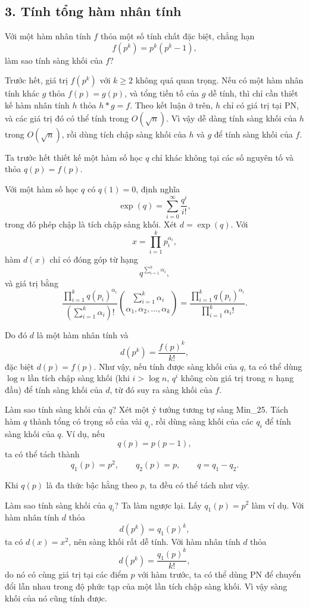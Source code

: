 \documentclass[11pt]{article}
\begin{document}
\subsection*{3. Tính tổng hàm nhân tính}

Với một hàm nhân tính \(f\) thỏa một số tính chất đặc biệt, chẳng hạn
\[
  f(p^k)=p^k(p^k-1),
\]
làm sao tính sàng khối của \(f\)?

Trước hết, giá trị \(f(p^k)\) với \(k\ge 2\) không quá quan trọng. Nếu có một
hàm nhân tính khác \(g\) thỏa \(f(p)=g(p)\), và tổng tiền tố của \(g\) dễ tính,
thì chỉ cần thiết kế hàm nhân tính \(h\) thỏa \(h*g=f\). Theo kết luận ở trên,
\(h\) chỉ có giá trị tại PN, và các giá trị đó có thể tính trong \(O(\sqrt n)\).
Vì vậy dễ dàng tính sàng khối của \(h\) trong \(O(\sqrt n)\), rồi dùng tích
chập sàng khối của \(h\) và \(g\) để tính sàng khối của \(f\).

Ta trước hết thiết kế một hàm số học \(q\) chỉ khác không tại các số nguyên tố
và thỏa \(q(p)=f(p)\).

Với một hàm số học \(q\) có \(q(1)=0\), định nghĩa
\[
  \exp(q)=\sum_{i=0}^{\infty}\frac{q^i}{i!},
\]
trong đó phép chập là tích chập sàng khối. Xét \(d=\exp(q)\). Với
\[
  x=\prod_{i=1}^{k} p_i^{\alpha_i},
\]
hàm \(d(x)\) chỉ có đóng góp từ hạng
\[
  q^{\sum_{i=1}^{k}\alpha_i},
\]
và giá trị bằng
\[
  \frac{\prod_{i=1}^{k} q(p_i)^{\alpha_i}}
       {\left(\sum_{i=1}^{k}\alpha_i\right)!}
  \binom{\sum_{i=1}^{k}\alpha_i}{\alpha_1,\alpha_2,\ldots,\alpha_k}
  =
  \frac{\prod_{i=1}^{k} q(p_i)^{\alpha_i}}
       {\prod_{i=1}^{k}\alpha_i!}.
\]

Do đó \(d\) là một hàm nhân tính và
\[
  d(p^k)=\frac{f(p)^k}{k!},
\]
đặc biệt \(d(p)=f(p)\). Như vậy, nếu tính được sàng khối của \(q\), ta có thể
dùng \(\log n\) lần tích chập sàng khối (khi \(i>\log n\), \(q^i\) không còn
giá trị trong \(n\) hạng đầu) để tính sàng khối của \(d\), từ đó suy ra sàng
khối của \(f\).

Làm sao tính sàng khối của \(q\)? Xét một ý tưởng tương tự sàng Min\_25. Tách
hàm \(q\) thành tổng có trọng số của vài \(q_i\), rồi dùng sàng khối của các
\(q_i\) để tính sàng khối của \(q\). Ví dụ, nếu
\[
  q(p)=p(p-1),
\]
ta có thể tách thành
\[
  q_1(p)=p^2,\qquad q_2(p)=p,\qquad q=q_1-q_2.
\]

Khi \(q(p)\) là đa thức bậc hằng theo \(p\), ta đều có thể tách như vậy.

Làm sao tính sàng khối của \(q_i\)? Ta làm ngược lại. Lấy \(q_1(p)=p^2\) làm
ví dụ. Với hàm nhân tính \(d\) thỏa
\[
  d(p^k)=q_1(p)^k,
\]
ta có \(d(x)=x^2\), nên sàng khối rất dễ tính. Với hàm nhân tính \(d\) thỏa
\[
  d(p^k)=\frac{q_1(p)^k}{k!},
\]
do nó có cùng giá trị tại các điểm \(p\) với hàm trước, ta có thể dùng PN để
chuyển đổi lẫn nhau trong độ phức tạp của một lần tích chập sàng khối. Vì vậy
sàng khối của nó cũng tính được.
\end{document}
